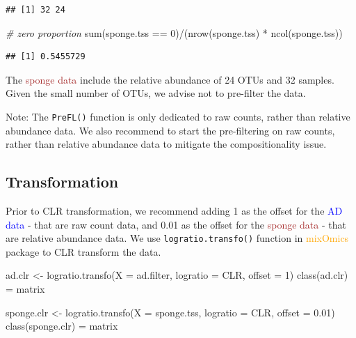 \documentclass[
]{book}
\newenvironment{Shaded}{\begin{snugshade}}{\end{snugshade}}
\newcommand{\AttributeTok}[1]{\textcolor[rgb]{0.77,0.63,0.00}{#1}}
\newcommand{\CommentTok}[1]{\textcolor[rgb]{0.56,0.35,0.01}{\textit{#1}}}
\newcommand{\DecValTok}[1]{\textcolor[rgb]{0.00,0.00,0.81}{#1}}
\newcommand{\FloatTok}[1]{\textcolor[rgb]{0.00,0.00,0.81}{#1}}
\newcommand{\FunctionTok}[1]{\textcolor[rgb]{0.00,0.00,0.00}{#1}}
\newcommand{\NormalTok}[1]{#1}
\newcommand{\OtherTok}[1]{\textcolor[rgb]{0.56,0.35,0.01}{#1}}
\newcommand{\SpecialCharTok}[1]{\textcolor[rgb]{0.00,0.00,0.00}{#1}}
\newcommand{\StringTok}[1]{\textcolor[rgb]{0.31,0.60,0.02}{#1}}
\begin{document}
\begin{verbatim}
## [1] 32 24
\end{verbatim}

\begin{Shaded}
\begin{Highlighting}[]
\CommentTok{\# zero proportion}
\FunctionTok{sum}\NormalTok{(sponge.tss }\SpecialCharTok{==} \DecValTok{0}\NormalTok{)}\SpecialCharTok{/}\NormalTok{(}\FunctionTok{nrow}\NormalTok{(sponge.tss) }\SpecialCharTok{*} \FunctionTok{ncol}\NormalTok{(sponge.tss))}
\end{Highlighting}
\end{Shaded}

\begin{verbatim}
## [1] 0.5455729
\end{verbatim}

The \textcolor{brown}{sponge data} include the relative abundance of 24 OTUs and 32 samples. Given the small number of OTUs, we advise not to pre-filter the data.

Note: The \texttt{PreFL()} function is only dedicated to raw counts, rather than relative abundance data. We also recommend to start the pre-filtering on raw counts, rather than relative abundance data to mitigate the compositionality issue.

\hypertarget{transformation}{%
\subsection{Transformation}\label{transformation}}

Prior to CLR transformation, we recommend adding 1 as the offset for the \textcolor{blue}{AD data} - that are raw count data, and 0.01 as the offset for the \textcolor{brown}{sponge data} - that are relative abundance data. We use \texttt{logratio.transfo()} function in \textcolor{orange}{mixOmics} package to CLR transform the data.

\begin{Shaded}
\begin{Highlighting}[]
\NormalTok{ad.clr }\OtherTok{\textless{}{-}} \FunctionTok{logratio.transfo}\NormalTok{(}\AttributeTok{X =}\NormalTok{ ad.filter, }\AttributeTok{logratio =} \StringTok{\textquotesingle{}CLR\textquotesingle{}}\NormalTok{, }\AttributeTok{offset =} \DecValTok{1}\NormalTok{) }
\FunctionTok{class}\NormalTok{(ad.clr) }\OtherTok{=} \StringTok{\textquotesingle{}matrix\textquotesingle{}}

\NormalTok{sponge.clr }\OtherTok{\textless{}{-}} \FunctionTok{logratio.transfo}\NormalTok{(}\AttributeTok{X =}\NormalTok{ sponge.tss, }\AttributeTok{logratio =} \StringTok{\textquotesingle{}CLR\textquotesingle{}}\NormalTok{, }\AttributeTok{offset =} \FloatTok{0.01}\NormalTok{)}
\FunctionTok{class}\NormalTok{(sponge.clr) }\OtherTok{=} \StringTok{\textquotesingle{}matrix\textquotesingle{}}
\end{Highlighting}
\end{Shaded}
\end{document}
